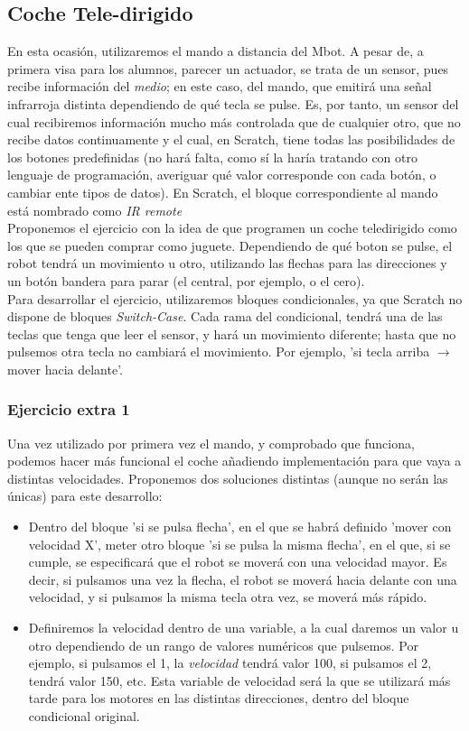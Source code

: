 \subsection{Coche Tele-dirigido}\label{ej:cocheTele}
En esta ocasión, utilizaremos el mando a distancia del Mbot. A pesar de, a primera visa para los alumnos, parecer un actuador, se trata de un sensor, pues recibe información del \textit{medio}; en este caso, del mando, que emitirá una señal infrarroja distinta dependiendo de qué tecla se pulse. Es, por tanto, un sensor del cual recibiremos información mucho más controlada que de cualquier otro, que no recibe datos continuamente y el cual, en Scratch, tiene todas las posibilidades de los botones predefinidas (no hará falta, como sí la haría tratando con otro lenguaje de programación, averiguar qué valor corresponde con cada botón, o cambiar ente tipos de datos). En Scratch, el bloque correspondiente al mando está nombrado como \textit{IR remote}\\
Proponemos el ejercicio con la idea de que programen un coche teledirigido como los que se pueden comprar como juguete. Dependiendo de qué boton se pulse, el robot tendrá un movimiento u otro, utilizando las flechas para las direcciones y un botón bandera para parar (el central, por ejemplo, o el cero). \\
Para desarrollar el ejercicio, utilizaremos bloques condicionales, ya que Scratch no dispone de bloques \textit{Switch-Case}. Cada rama del condicional, tendrá una de las teclas que tenga que leer el sensor, y hará un movimiento diferente; hasta que no pulsemos otra tecla no cambiará el movimiento. Por ejemplo, 'si tecla arriba $\rightarrow$ mover hacia delante'.
\subsubsection{Ejercicio extra 1}
Una vez utilizado por primera vez el mando, y comprobado que funciona, podemos hacer más funcional el coche añadiendo implementación para que vaya a distintas velocidades. Proponemos dos soluciones distintas (aunque no serán las únicas) para este desarrollo:
\begin{itemize}
	\item Dentro del bloque 'si se pulsa flecha', en el que se habrá definido 'mover con velocidad X', meter otro bloque 'si se pulsa la misma flecha', en el que, si se cumple, se especificará que el robot se moverá con una velocidad mayor. Es decir, si pulsamos una vez la flecha, el robot se moverá hacia delante con una velocidad, y si pulsamos la misma tecla otra vez, se moverá más rápido.
	\item Definiremos la velocidad dentro de una variable, a la cual daremos un valor u otro dependiendo de un rango de valores numéricos que pulsemos. Por ejemplo, si pulsamos el 1, la \textit{velocidad} tendrá valor 100, si pulsamos el 2, tendrá valor 150, etc. Esta variable de velocidad será la que se utilizará más tarde para los motores en las distintas direcciones, dentro del bloque condicional original.
\end{itemize}
